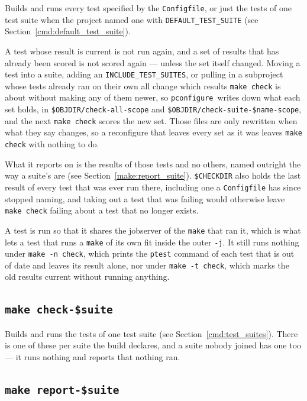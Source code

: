 \documentclass{article}
\newcommand{\pconfigure}{\texttt{pconfigure}}
\begin{document}
Builds and runs every test specified by the \texttt{Configfile}, or
just the tests of one test suite when the project named one with
\texttt{DEFAULT\_TEST\_SUITE} (see Section~\ref{cmd:default_test_suite}).

A test whose result is current is not run again, and a set of results
that has already been scored is not scored again --- unless the set
itself changed.  Moving a test into a suite, adding an
\texttt{INCLUDE\_TEST\_SUITES}, or pulling in a subproject whose
tests already ran on their own all change which results \texttt{make
  check} is about without making any of them newer, so \pconfigure\
writes down what each set holds, in \texttt{\$OBJDIR/check-all-scope}
and \texttt{\$OBJDIR/check-suite-\$name-scope}, and the next
\texttt{make check} scores the new set.  Those files are only
rewritten when what they say changes, so a reconfigure that leaves
every set as it was leaves \texttt{make check} with nothing to do.

What it reports on is the results of those tests and no others, named
outright the way a suite's are (see Section~\ref{make:report_suite}).
\texttt{\$CHECKDIR} also holds the last result of every test that was
ever run there, including one a \texttt{Configfile} has since stopped
naming, and taking out a test that was failing would otherwise leave
\texttt{make check} failing about a test that no longer exists.

A test is run so that it shares the jobserver of the \texttt{make}
that ran it, which is what lets a test that runs a \texttt{make} of
its own fit inside the outer \texttt{-j}.  It still runs nothing under
\texttt{make -n check}, which prints the \texttt{ptest} command of
each test that is out of date and leaves its result alone, nor under
\texttt{make -t check}, which marks the old results current without
running anything.

\subsection{\texttt{make check-\$suite} \label{make:check_suite}}

Builds and runs the tests of one test suite (see
Section~\ref{cmd:test_suites}).  There is one of these per suite the
build declares, and a suite nobody joined has one too --- it runs
nothing and reports that nothing ran.

\subsection{\texttt{make report-\$suite} \label{make:report_suite}}
\end{document}
